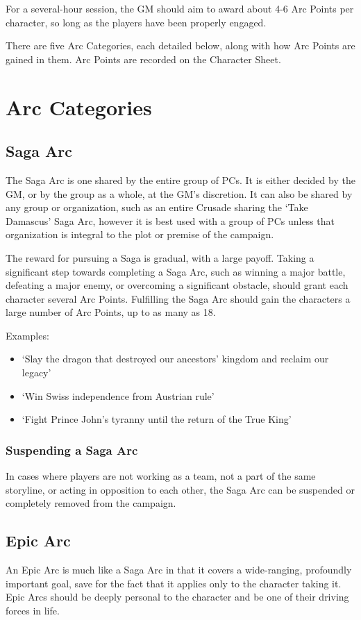 \documentclass[oneside,11pt,english]{book}
\begin{document}
 
For a several-hour session, the GM should aim to award about 4-6 Arc Points per character, so long as the 
players have been properly engaged. 
 

There are five Arc Categories, each detailed below, along with how Arc Points are gained in them. Arc 
Points are recorded on the Character Sheet. 
\section{Arc Categories}

\subsection{Saga Arc}
The Saga Arc is one shared by the entire group of PCs. It is either decided by the GM, or by the group as 
a whole, at the GM’s discretion. It can also be shared by any group or organization, such as an entire 
Crusade sharing the ‘Take Damascus’ Saga Arc, however it is best used with a group of PCs unless that 
organization is integral to the plot or premise of the campaign. 
 

The reward for pursuing a Saga is gradual, with a large payoff. Taking a significant step towards 
completing a Saga Arc, such as winning a major battle, defeating a major enemy, or overcoming a 
significant obstacle, should grant each character several Arc Points. Fulfilling the Saga Arc should gain 
the characters a large number of Arc Points, up to as many as 18. 


Examples:
\begin{itemize}
\item ‘Slay the dragon that destroyed our ancestors’ kingdom and reclaim our legacy’ 
\item ‘Win Swiss independence from Austrian rule’ 
\item ‘Fight Prince John’s tyranny until the return of the True King’ 
\end{itemize} 
 
\subsubsection{Suspending a Saga Arc}
In cases where players are not working as a team, not a part of the same storyline, or acting in opposition 
to each other, the Saga Arc can be suspended or completely removed from the campaign. 

 

\subsection{Epic Arc} 
An Epic Arc is much like a Saga Arc in that it covers a wide-ranging, profoundly important goal, save for 
the fact that it applies only to the character taking it. Epic Arcs should be deeply personal to the character 
and be one of their driving forces in life. 
\end{document}
